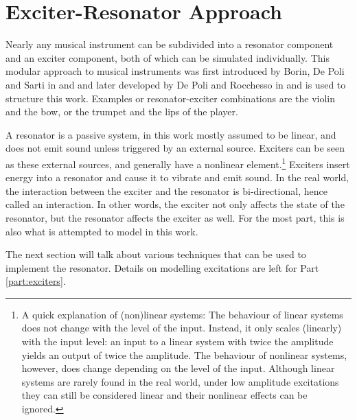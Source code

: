 \section{Exciter-Resonator Approach}\label{sec:exciterResonator}
Nearly any musical instrument can be subdivided into a resonator component and an exciter component, both of which can be simulated individually. This modular approach to musical instruments was first introduced by Borin, De Poli and Sarti in \cite{Borin1989} and and later developed by De Poli and Rocchesso in \cite{Poli1998} and is used to structure this work. Examples or resonator-exciter combinations are the violin and the bow, or the trumpet and the lips of the player. %

A resonator is a passive system, in this work mostly assumed to be linear, and does not emit sound unless triggered by an external source. Exciters can be seen as these external sources, and generally have a nonlinear element.\footnote{A quick explanation of (non)linear systems: The behaviour of linear systems does not change with the level of the input. Instead, it only scales (linearly) with the input level: an input to a linear system with twice the amplitude yields an output of twice the amplitude. The behaviour of nonlinear systems, however, does change depending on the level of the input. Although linear systems are rarely found in the real world, under low amplitude excitations they can still be considered linear and their nonlinear effects can be ignored.} Exciters insert energy into a resonator and cause it to vibrate and emit sound. In the real world, the interaction between the exciter and the resonator is bi-directional, hence called an interaction. In other words, the exciter not only affects the state of the resonator, but the resonator affects the exciter as well. For the most part, this is also what is attempted to model in this work.

The next section will talk about various techniques that can be used to implement the resonator. Details on modelling excitations are left for Part \ref{part:exciters}.

